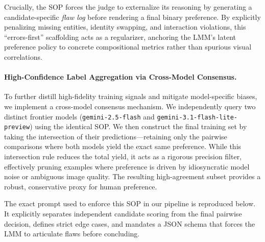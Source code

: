 Crucially, the SOP forces the judge to externalize its reasoning by generating a candidate-specific \emph{flaw log} before rendering a final binary preference. By explicitly penalizing missing entities, identity swapping, and interaction violations, this ``errors-first'' scaffolding acts as a regularizer, anchoring the LMM's latent preference policy to concrete compositional metrics rather than spurious visual correlations.

\paragraph{High-Confidence Label Aggregation via Cross-Model Consensus.}
To further distill high-fidelity training signals and mitigate model-specific biases, we implement a cross-model consensus mechanism. We independently query two distinct frontier models (\texttt{gemini-2.5-flash} and \texttt{gemini-3.1-flash-lite-preview}) using the identical SOP. We then construct the final training set by taking the intersection of their predictions---retaining only the pairwise comparisons where both models yield the exact same preference. While this intersection rule reduces the total yield, it acts as a rigorous precision filter, effectively pruning examples where preference is driven by idiosyncratic model noise or ambiguous image quality. The resulting high-agreement subset provides a robust, conservative proxy for human preference.

The exact prompt used to enforce this SOP in our pipeline is reproduced below. It explicitly separates independent candidate scoring from the final pairwise decision, defines strict edge cases, and mandates a JSON schema that forces the LMM to articulate flaws before concluding.

